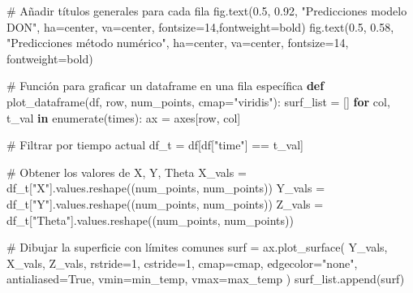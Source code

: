 \documentclass[
  spanish,
  us-letterpaper,
]{scrreprt}
\newenvironment{Shaded}{\begin{snugshade}}{\end{snugshade}}
\newcommand{\BuiltInTok}[1]{\textcolor[rgb]{0.00,0.23,0.31}{#1}}
\newcommand{\CommentTok}[1]{\textcolor[rgb]{0.37,0.37,0.37}{#1}}
\newcommand{\ControlFlowTok}[1]{\textcolor[rgb]{0.00,0.23,0.31}{\textbf{#1}}}
\newcommand{\DecValTok}[1]{\textcolor[rgb]{0.68,0.00,0.00}{#1}}
\newcommand{\FloatTok}[1]{\textcolor[rgb]{0.68,0.00,0.00}{#1}}
\newcommand{\KeywordTok}[1]{\textcolor[rgb]{0.00,0.23,0.31}{\textbf{#1}}}
\newcommand{\NormalTok}[1]{\textcolor[rgb]{0.00,0.23,0.31}{#1}}
\newcommand{\OperatorTok}[1]{\textcolor[rgb]{0.37,0.37,0.37}{#1}}
\newcommand{\StringTok}[1]{\textcolor[rgb]{0.13,0.47,0.30}{#1}}
\newcommand{\VariableTok}[1]{\textcolor[rgb]{0.07,0.07,0.07}{#1}}
\theoremstyle{definition}
\theoremstyle{plain}
\theoremstyle{remark}
\begin{document}
\begin{Shaded}
\begin{Highlighting}[]
\CommentTok{\# Añadir títulos generales para cada fila}
\NormalTok{fig.text(}\FloatTok{0.5}\NormalTok{, }\FloatTok{0.92}\NormalTok{, }\StringTok{"Predicciones modelo DON"}\NormalTok{, }
\NormalTok{        ha}\OperatorTok{=}\StringTok{\textquotesingle{}center\textquotesingle{}}\NormalTok{, va}\OperatorTok{=}\StringTok{\textquotesingle{}center\textquotesingle{}}\NormalTok{, fontsize}\OperatorTok{=}\DecValTok{14}\NormalTok{,fontweight}\OperatorTok{=}\StringTok{\textquotesingle{}bold\textquotesingle{}}\NormalTok{)}
\NormalTok{fig.text(}\FloatTok{0.5}\NormalTok{, }\FloatTok{0.58}\NormalTok{, }\StringTok{"Predicciones método numérico"}\NormalTok{,}
\NormalTok{        ha}\OperatorTok{=}\StringTok{\textquotesingle{}center\textquotesingle{}}\NormalTok{, va}\OperatorTok{=}\StringTok{\textquotesingle{}center\textquotesingle{}}\NormalTok{, fontsize}\OperatorTok{=}\DecValTok{14}\NormalTok{, fontweight}\OperatorTok{=}\StringTok{\textquotesingle{}bold\textquotesingle{}}\NormalTok{)}

\CommentTok{\# Función para graficar un dataframe en una fila específica}
\KeywordTok{def}\NormalTok{ plot\_dataframe(df, row, num\_points, cmap}\OperatorTok{=}\StringTok{"viridis"}\NormalTok{):}
\NormalTok{    surf\_list }\OperatorTok{=}\NormalTok{ []}
    \ControlFlowTok{for}\NormalTok{ col, t\_val }\KeywordTok{in} \BuiltInTok{enumerate}\NormalTok{(times):}
\NormalTok{        ax }\OperatorTok{=}\NormalTok{ axes[row, col]}
        
        \CommentTok{\# Filtrar por tiempo actual}
\NormalTok{        df\_t }\OperatorTok{=}\NormalTok{ df[df[}\StringTok{"time"}\NormalTok{] }\OperatorTok{==}\NormalTok{ t\_val]}

        \CommentTok{\# Obtener los valores de X, Y, Theta}
\NormalTok{        X\_vals }\OperatorTok{=}\NormalTok{ df\_t[}\StringTok{"X"}\NormalTok{].values.reshape((num\_points, num\_points))}
\NormalTok{        Y\_vals }\OperatorTok{=}\NormalTok{ df\_t[}\StringTok{"Y"}\NormalTok{].values.reshape((num\_points, num\_points))}
\NormalTok{        Z\_vals }\OperatorTok{=}\NormalTok{ df\_t[}\StringTok{"Theta"}\NormalTok{].values.reshape((num\_points, num\_points))}

        \CommentTok{\# Dibujar la superficie con límites comunes}
\NormalTok{        surf }\OperatorTok{=}\NormalTok{ ax.plot\_surface(}
\NormalTok{            Y\_vals, X\_vals, Z\_vals,}
\NormalTok{            rstride}\OperatorTok{=}\DecValTok{1}\NormalTok{, cstride}\OperatorTok{=}\DecValTok{1}\NormalTok{,}
\NormalTok{            cmap}\OperatorTok{=}\NormalTok{cmap,}
\NormalTok{            edgecolor}\OperatorTok{=}\StringTok{"none"}\NormalTok{,}
\NormalTok{            antialiased}\OperatorTok{=}\VariableTok{True}\NormalTok{,}
\NormalTok{            vmin}\OperatorTok{=}\NormalTok{min\_temp,}
\NormalTok{            vmax}\OperatorTok{=}\NormalTok{max\_temp}
\NormalTok{        )}
\NormalTok{        surf\_list.append(surf)}


\end{Highlighting}
\end{Shaded}
\end{document}
